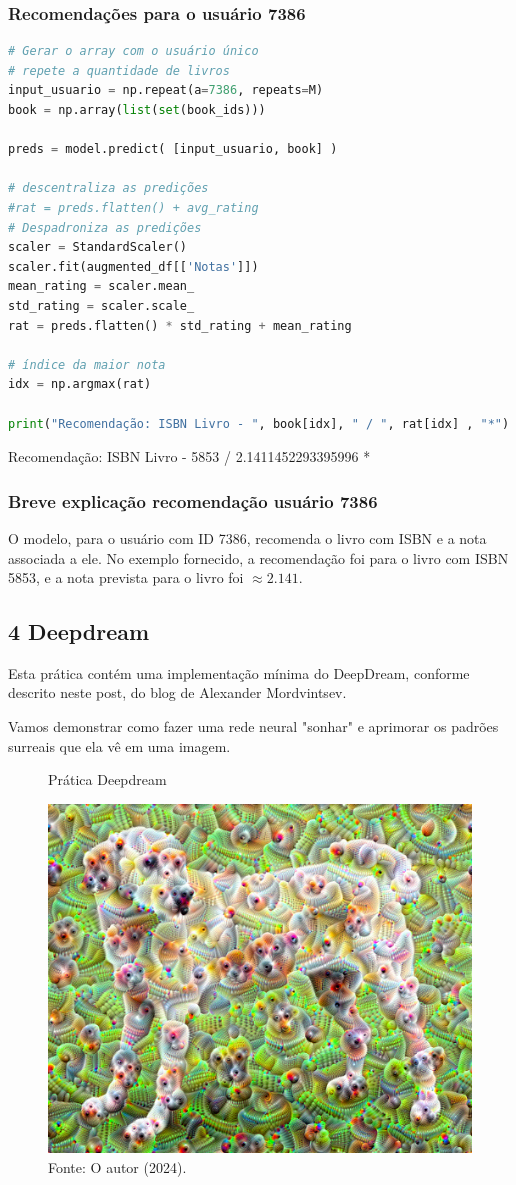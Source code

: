 \subsubsection*{Recomendações para o usuário 7386}
\begin{lstlisting}[language=Python, style=input]
# Gerar o array com o usuário único
# repete a quantidade de livros
input_usuario = np.repeat(a=7386, repeats=M)
book = np.array(list(set(book_ids)))

preds = model.predict( [input_usuario, book] )

# descentraliza as predições
#rat = preds.flatten() + avg_rating
# Despadroniza as predições
scaler = StandardScaler()
scaler.fit(augmented_df[['Notas']])
mean_rating = scaler.mean_
std_rating = scaler.scale_
rat = preds.flatten() * std_rating + mean_rating

# índice da maior nota
idx = np.argmax(rat)

print("Recomendação: ISBN Livro - ", book[idx], " / ", rat[idx] , "*")
\end{lstlisting}
\begin{tcolorbox}[myoutputstyle]
Recomendação: ISBN Livro -  5853  /  2.1411452293395996 *
\end{tcolorbox}
\subsubsection*{Breve explicação recomendação usuário 7386}
O modelo, para o usuário com ID 7386, recomenda o livro com ISBN e a nota associada a ele. No exemplo fornecido, a recomendação foi para o livro com ISBN 5853, e a nota prevista para o livro foi $\approx2.141$.

\subsection*{\textbf{4 Deepdream}}
Esta prática contém uma implementação mínima do DeepDream, conforme descrito neste post, do blog de Alexander Mordvintsev.

Vamos demonstrar como fazer uma rede neural "sonhar" e aprimorar os padrões surreais que ela vê em uma imagem.
\begin{figure}[H]
\centering
\caption{Prática Deepdream}
\includegraphics[width=.8\linewidth]{apendices/fig/13_IAA012_10.png}
\caption*{Fonte: O autor (2024).}
\end{figure}
